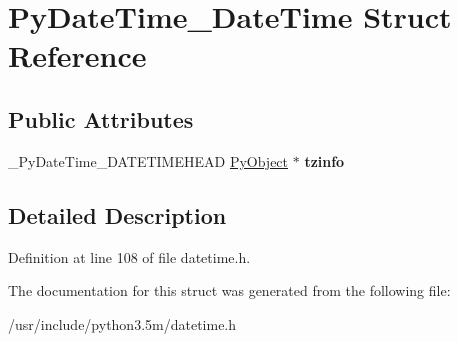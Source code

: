 \hypertarget{structPyDateTime__DateTime}{}\section{Py\+Date\+Time\+\_\+\+Date\+Time Struct Reference}
\label{structPyDateTime__DateTime}
\subsection*{Public Attributes}
\begin{DoxyCompactItemize}
\item 
\+\_\+\+Py\+Date\+Time\+\_\+\+D\+A\+T\+E\+T\+I\+M\+E\+H\+E\+AD \hyperlink{struct__object}{Py\+Object} $\ast$ {\bfseries tzinfo}\hypertarget{structPyDateTime__DateTime_a11483552924818dd195700bba9e1f492}{}\label{structPyDateTime__DateTime_a11483552924818dd195700bba9e1f492}

\end{DoxyCompactItemize}


\subsection{Detailed Description}


Definition at line 108 of file datetime.\+h.



The documentation for this struct was generated from the following file\+:\begin{DoxyCompactItemize}
\item 
/usr/include/python3.\+5m/datetime.\+h\end{DoxyCompactItemize}
